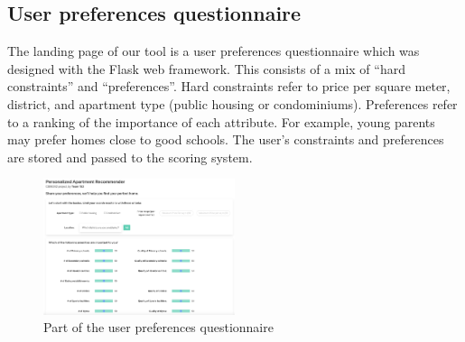 \documentclass[a4paper, 11pt]{article}
\begin{document}

    \subsection{User preferences questionnaire}

    The landing page of our tool is a user preferences questionnaire which was designed with the Flask web framework. This consists of a mix of “hard constraints” and “preferences”. Hard constraints refer to price per square meter, district, and apartment type (public housing or condominiums). Preferences refer to a ranking of the importance of each attribute. For example, young parents may prefer homes close to good schools. The user's constraints and preferences are stored and passed to the scoring system.

   \begin{figure}[h]
   \centering
   \includegraphics[width={0.5\textwidth}]{questionnaire.png}
   \caption{Part of the user preferences questionnaire}
   \end{figure}
\end{document}
